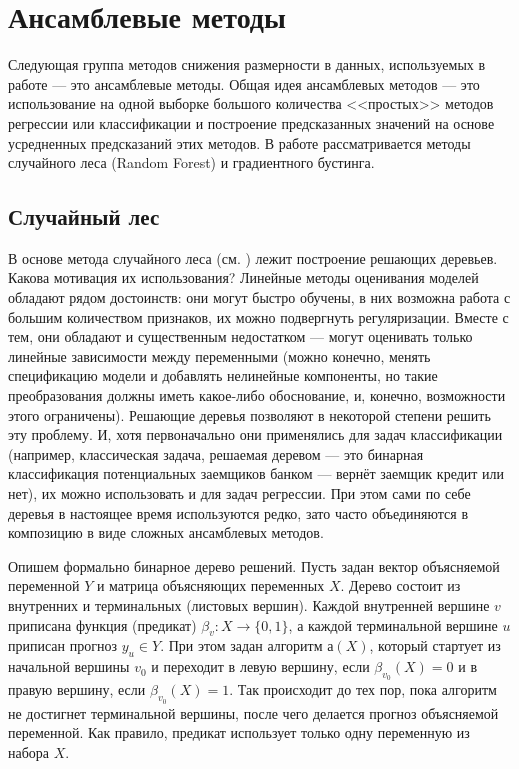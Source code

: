 \section{Ансамблевые методы}
Следующая группа методов снижения размерности в данных, используемых в работе --- это ансамблевые методы. Общая идея ансамблевых методов --- это использование на одной выборке большого количества <<простых>> методов регрессии или классификации и построение предсказанных значений на основе усредненных предсказаний этих методов. В работе рассматривается методы случайного леса (Random Forest) и градиентного бустинга.
\subsection{Случайный лес}
В основе метода случайного леса (см. \cite{liaw2002classification}) лежит построение решающих деревьев. Какова мотивация их использования? Линейные методы оценивания моделей обладают рядом достоинств: они могут быстро обучены, в них возможна работа с большим количеством признаков, их можно подвергнуть регуляризации. Вместе с тем, они обладают и существенным недостатком --- могут оценивать только линейные зависимости между переменными (можно конечно, менять спецификацию модели и добавлять нелинейные компоненты, но такие преобразования должны иметь какое-либо обоснование, и, конечно, возможности этого ограничены). Решающие деревья позволяют в некоторой степени решить эту проблему. И, хотя первоначально они применялись для задач классификации (например, классическая задача, решаемая деревом --- это бинарная классификация потенциальных заемщиков банком --- вернёт заемщик кредит или нет), их можно использовать и для задач регрессии. При этом сами по себе деревья в настоящее время используются редко, зато часто объединяются в композицию в виде сложных ансамблевых методов.

Опишем формально бинарное дерево решений. Пусть задан вектор объясняемой переменной $Y$ и матрица объясняющих переменных $X$.
Дерево состоит из внутренних и терминальных (листовых вершин). Каждой внутренней вершине $v$ приписана функция (предикат) $\beta_v: X \rightarrow \{0,1\}$, а каждой терминальной вершине $u$ приписан прогноз $y_u \in Y$. При этом задан алгоритм $а(X)$, который стартует из начальной вершины $v_0$ и переходит в левую вершину, если $\beta_{v_0}(X) = 0$ и в правую вершину, если $\beta_{v_0}(X) = 1$. Так происходит до тех пор, пока алгоритм не достигнет терминальной вершины, после чего делается прогноз объясняемой переменной.
Как правило, предикат использует только одну переменную из набора $X$. 

